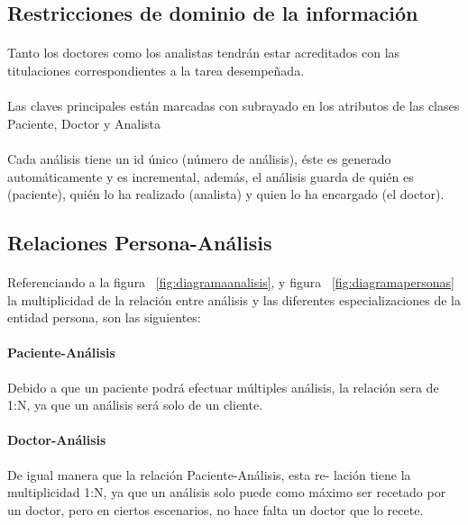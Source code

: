 \documentclass[a4paper,10pt]{article}
\begin{document}
\subsection{Restricciones de dominio de la información}

\paragraph{}
Tanto los doctores como los analistas tendrán estar acreditados con las titulaciones correspondientes a la tarea desempeñada.
\paragraph{}
Las claves principales están marcadas con subrayado en los atributos de las clases Paciente, Doctor y Analista
\paragraph{}
Cada análisis tiene un id único (número de análisis), éste es generado automáticamente y es incremental, además, el análisis guarda de quién es (paciente), quién lo ha realizado (analista) y quien lo ha encargado (el doctor).
\subsection{Relaciones Persona-Análisis}
\paragraph{}
Referenciando a la figura ~\ref{fig:diagramaanalisis}, y figura ~\ref{fig:diagramapersonas} la multiplicidad de la relación entre análisis y las diferentes especializaciones de la entidad persona, son las siguientes:
\paragraph{Paciente-Análisis}
Debido a que un paciente podrá efectuar múltiples análisis, la relación sera de 1:N, ya que un análisis será solo de un cliente.
\paragraph{Doctor-Análisis}
De igual manera que la relación Paciente-Análisis, esta re-
lación tiene la multiplicidad 1:N, ya que un análisis solo puede como máximo
ser recetado por un doctor, pero en ciertos escenarios, no hace falta un doctor
que lo recete.
\end{document}
